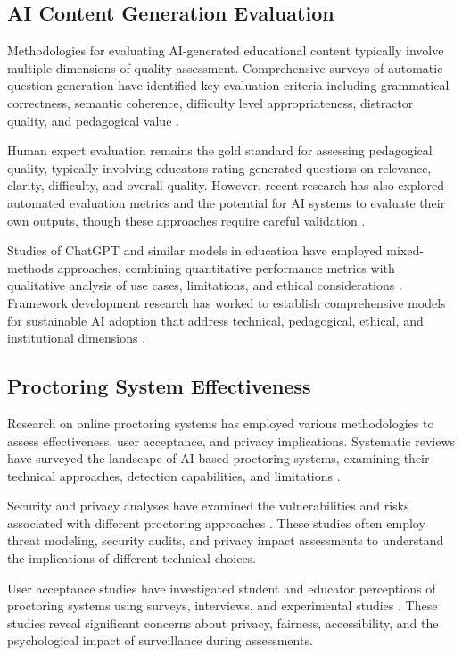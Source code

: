 \subsection{AI Content Generation Evaluation}

Methodologies for evaluating AI-generated educational content typically involve multiple dimensions of quality assessment. Comprehensive surveys of automatic question generation have identified key evaluation criteria including grammatical correctness, semantic coherence, difficulty level appropriateness, distractor quality, and pedagogical value \citep{biancini2024}.

Human expert evaluation remains the gold standard for assessing pedagogical quality, typically involving educators rating generated questions on relevance, clarity, difficulty, and overall quality. However, recent research has also explored automated evaluation metrics and the potential for AI systems to evaluate their own outputs, though these approaches require careful validation \citep{kasneci2023}.

Studies of ChatGPT and similar models in education have employed mixed-methods approaches, combining quantitative performance metrics with qualitative analysis of use cases, limitations, and ethical considerations \citep{kasneci2023}. Framework development research has worked to establish comprehensive models for sustainable AI adoption that address technical, pedagogical, ethical, and institutional dimensions \citep{kasneci2023}.

\subsection{Proctoring System Effectiveness}

Research on online proctoring systems has employed various methodologies to assess effectiveness, user acceptance, and privacy implications. Systematic reviews have surveyed the landscape of AI-based proctoring systems, examining their technical approaches, detection capabilities, and limitations \citep{balderas2021}.

Security and privacy analyses have examined the vulnerabilities and risks associated with different proctoring approaches \citep{balderas2021}. These studies often employ threat modeling, security audits, and privacy impact assessments to understand the implications of different technical choices.

User acceptance studies have investigated student and educator perceptions of proctoring systems using surveys, interviews, and experimental studies \citep{balderas2021}. These studies reveal significant concerns about privacy, fairness, accessibility, and the psychological impact of surveillance during assessments.

